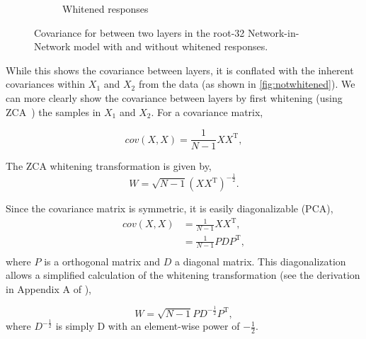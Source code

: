 \documentclass[thesis]{subfiles}
\begin{document}
\begin{figure}[tbp]
\begin{subfigure}[b]{0.3\textheight}
			\caption{Whitened responses}
			\label{fig:whitened}
		\end{subfigure}
		\caption[Inter-layer covariance with/without whitened responses.]{Covariance for between two layers in the root-32 Network-in-Network model with and without whitened responses.}
		\label{fig:whitevsnot}
	\end{figure}
	
	While this shows the covariance between layers, it is conflated with the inherent covariances within $X_1$ and $X_2$ from the data (as shown in \cref{fig:notwhitened}). We can more clearly show the covariance between layers by first whitening (using ZCA~\cite{CIFAR10}) the samples in $X_1$ and $X_2$. For a covariance matrix,
	
	\begin{equation}
	cov(X, X) = \frac{1}{N-1} XX^\textrm{T},
	\end{equation}
	
	The ZCA whitening transformation is given by,
	\begin{equation}
	W = \sqrt{N-1}\left(XX^\textrm{T}\right)^{-\frac{1}{2}}.
	\end{equation}
	
	Since the covariance matrix is symmetric, it is easily diagonalizable (\ie PCA),
	\begin{align}
	cov(X, X) &= \frac{1}{N-1} XX^\textrm{T},\\
	&=\frac{1}{N-1} PDP^\textrm{T},\\
	\end{align}
	where $P$ is a orthogonal matrix and $D$ a diagonal matrix. This diagonalization allows a simplified calculation of the whitening transformation (see the derivation in Appendix A of \citet{CIFAR10}),
	
	\begin{equation}
	W = \sqrt{N-1}PD^{-\frac{1}{2}}P^\textrm{T},
	\end{equation}
	where $D^{-\frac{1}{2}}$ is simply D with an element-wise power of $-\frac{1}{2}$.
	
\end{document}
